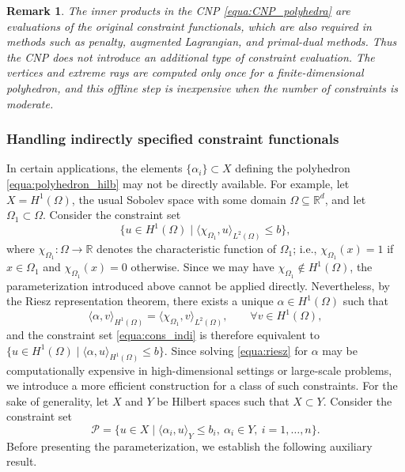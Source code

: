 \documentclass{article}
\numberwithin{equation}{section}
\newtheorem{remark}{Remark}[section]
\begin{document}
\begin{remark}The inner products in the CNP \eqref{equa:CNP_polyhedra} are evaluations of the original constraint functionals, which are also required in methods such as penalty, augmented Lagrangian, and primal-dual methods. Thus the CNP does not introduce an additional type of constraint evaluation. The vertices and extreme rays are computed only once for a finite-dimensional polyhedron, and this offline step is inexpensive when the number of constraints is moderate.
\end{remark}

\subsubsection{Handling indirectly specified constraint functionals}\label{sec:alpha_i}

In certain applications, the elements $\{\alpha_i\}\subset X$ defining the polyhedron \eqref{equa:polyhedron_hilb} may not be directly available. For example, let $X=H^1(\Omega)$, the usual Sobolev space \cite{FournierAdams} with some domain $\Omega\subseteq\mathbb{R}^d$, and let $\Omega_1\subset\Omega$. Consider the constraint set
\begin{equation}\label{equa:cons_indi}
    \{u\in H^1(\Omega)\mid \langle \chi_{\Omega_1},u\rangle_{L^2(\Omega)}\le b\},
\end{equation}
where $\chi_{\Omega_1}:\Omega\to\mathbb{R}$ denotes the characteristic function of $\Omega_1$; i.e., $\chi_{\Omega_1}(x)=1$ if $x\in\Omega_1$ and $\chi_{\Omega_1}(x)=0$ otherwise.
Since we may have $\chi_{\Omega_1}\notin H^1(\Omega)$, the parameterization introduced above cannot be applied directly. Nevertheless, by the Riesz representation theorem, there exists a unique $\alpha\in H^1(\Omega)$ such that
\begin{equation}\label{equa:riesz}
    \langle \alpha,v\rangle_{H^1(\Omega)}
    =
    \langle \chi_{\Omega_1},v\rangle_{L^2(\Omega)},
    \qquad \forall v\in H^1(\Omega),
\end{equation}
and the constraint set \eqref{equa:cons_indi} is therefore equivalent to
    $\{u\in H^1(\Omega)\mid \langle \alpha,u\rangle_{H^1(\Omega)}\le b\}$.
Since solving \eqref{equa:riesz} for $\alpha$  may be computationally expensive in high-dimensional settings or large-scale problems, we introduce a more efficient construction for a class of such constraints. For the sake of generality, let $X$ and $Y$ be Hilbert spaces such that $X\subset Y$. Consider the constraint set
\begin{equation}\label{equa:polydra_general}
    \mathcal{P}
    =
    \{u\in X\mid \langle \alpha_i,u\rangle_Y\le b_i,\ \alpha_i\in Y,\ i=1,\dots,n\}.
\end{equation}
Before presenting the parameterization, we establish the following auxiliary result.
\end{document}
